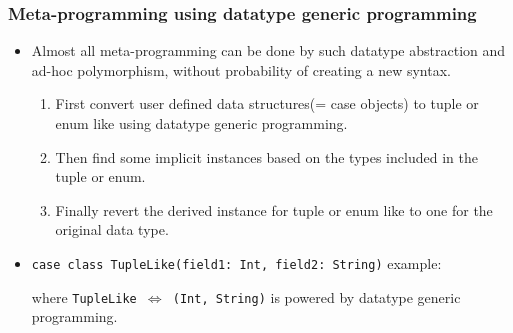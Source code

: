 \begin{frame}[fragile]
  \frametitle{Meta-programming using datatype generic programming}
  
  \begin{itemize}
    \item Almost all meta-programming can be done by such datatype abstraction
    and ad-hoc polymorphism, without probability of creating a new syntax.
    \pause
    \begin{enumerate}
      \item First convert user defined data structures(= case objects) to tuple or enum like using datatype generic programming.
      \item Then find some implicit instances based on the types included in the tuple or enum.
      \item Finally revert the derived instance for tuple or enum like to one for the original data type.
    \end{enumerate}

    \pause
    \item \lstinline|case class TupleLike(field1: Int, field2: String)| example:
    \begin{scaledprooftree}{0.8}
    \end{scaledprooftree}
    where {\small \texttt{TupleLike $\Leftrightarrow$ (Int, String)}} is powered by datatype generic programming.
  \end{itemize}

\end{frame}

